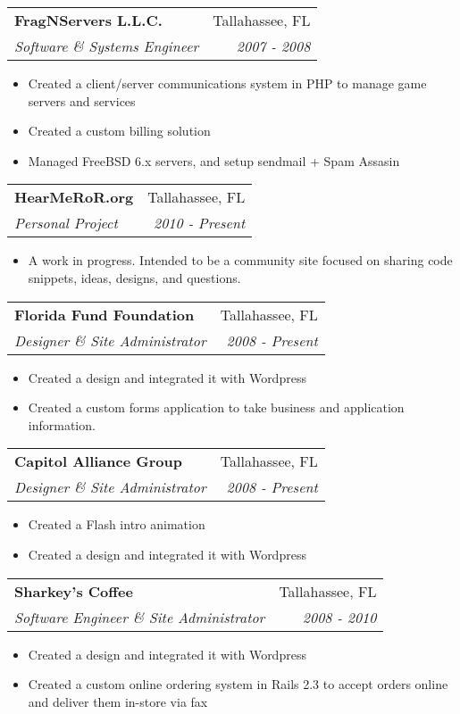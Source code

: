 \documentclass[letterpaper,11pt]{article}
\makeatletter
\newcommand{\resitem}[1]{\item #1 \vspace{-2pt}}
\newcommand{\ressubheading}[4]{
\begin{tabular*}{7.0in}{l@{\extracolsep{\fill}}r}
		\textbf{#1} & #2 \\
		\textit{#3} & \textit{#4} \\
\end{tabular*}\vspace{-6pt}}
\makeatother
\begin{document}
\pagebreakwithheader

\ressubheading{FragNServers L.L.C.}{Tallahassee, FL}{Software \& Systems Engineer}{2007 - 2008}
\begin{itemize} 
        \resitem{Created a client/server communications system in PHP to manage game servers and services}
        \resitem{Created a custom billing solution}
        \resitem{Managed FreeBSD 6.x servers, and setup sendmail + Spam Assasin}
\end{itemize}

\ressubheading{HearMeRoR.org}{Tallahassee, FL}{Personal Project}{2010 - Present}
\begin{itemize} 
        \resitem{A work in progress. Intended to be a community site focused on sharing code snippets, ideas, designs, and questions.}
\end{itemize}

\ressubheading{Florida Fund Foundation}{Tallahassee, FL}{Designer \& Site Administrator}{2008 - Present}
\begin{itemize} 
        \resitem{Created a design and integrated it with Wordpress}
        \resitem{Created a custom forms application to take business and application information.}
\end{itemize}

\ressubheading{Capitol Alliance Group}{Tallahassee, FL}{Designer \& Site Administrator}{2008 - Present}
\begin{itemize} 
        \resitem{Created a Flash intro animation}
        \resitem{Created a design and integrated it with Wordpress}
\end{itemize}

\ressubheading{Sharkey's Coffee}{Tallahassee, FL}{Software Engineer \& Site Administrator}{2008 - 2010}
\begin{itemize} 
        \resitem{Created a design and integrated it with Wordpress}
        \resitem{Created a custom online ordering system in Rails 2.3 to accept orders online and deliver them in-store via fax}
\end{itemize}
\end{document}
